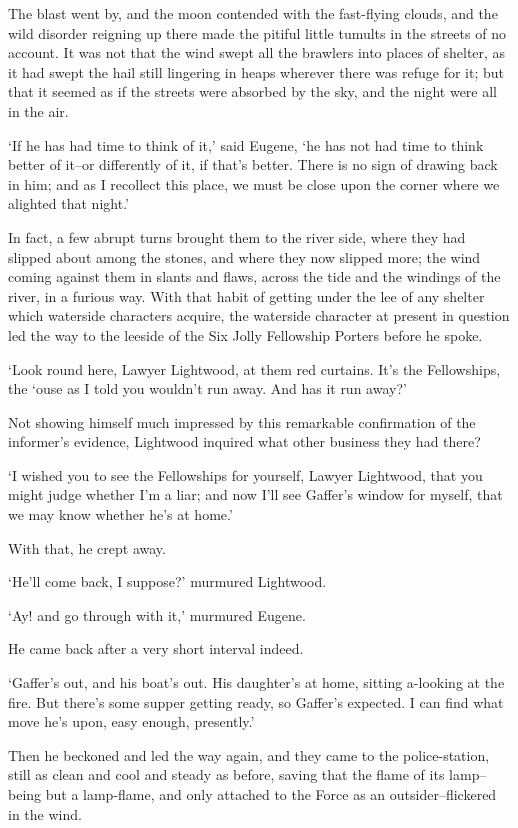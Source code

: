 The blast went by, and the moon contended with the fast-flying clouds,
and the wild disorder reigning up there made the pitiful little tumults
in the streets of no account. It was not that the wind swept all
the brawlers into places of shelter, as it had swept the hail still
lingering in heaps wherever there was refuge for it; but that it seemed
as if the streets were absorbed by the sky, and the night were all in
the air.

‘If he has had time to think of it,’ said Eugene, ‘he has not had time to
think better of it--or differently of it, if that’s better. There is no
sign of drawing back in him; and as I recollect this place, we must be
close upon the corner where we alighted that night.’

In fact, a few abrupt turns brought them to the river side, where they
had slipped about among the stones, and where they now slipped more; the
wind coming against them in slants and flaws, across the tide and the
windings of the river, in a furious way. With that habit of getting
under the lee of any shelter which waterside characters acquire, the
waterside character at present in question led the way to the leeside of
the Six Jolly Fellowship Porters before he spoke.

‘Look round here, Lawyer Lightwood, at them red curtains. It’s the
Fellowships, the ‘ouse as I told you wouldn’t run away. And has it run
away?’

Not showing himself much impressed by this remarkable confirmation of
the informer’s evidence, Lightwood inquired what other business they had
there?

‘I wished you to see the Fellowships for yourself, Lawyer Lightwood,
that you might judge whether I’m a liar; and now I’ll see Gaffer’s
window for myself, that we may know whether he’s at home.’

With that, he crept away.

‘He’ll come back, I suppose?’ murmured Lightwood.

‘Ay! and go through with it,’ murmured Eugene.

He came back after a very short interval indeed.

‘Gaffer’s out, and his boat’s out. His daughter’s at home, sitting
a-looking at the fire. But there’s some supper getting ready, so
Gaffer’s expected. I can find what move he’s upon, easy enough,
presently.’

Then he beckoned and led the way again, and they came to the
police-station, still as clean and cool and steady as before, saving
that the flame of its lamp--being but a lamp-flame, and only attached to
the Force as an outsider--flickered in the wind.

